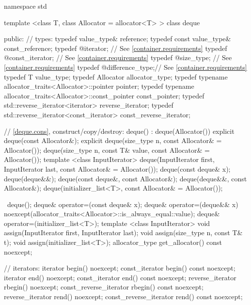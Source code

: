 \begin{codeblock}
namespace std {
  template <class T, class Allocator = allocator<T> >
  class deque {
  public:
    // types:
    typedef value_type&                           reference;
    typedef const value_type&                     const_reference;
    typedef @\impdef@                iterator;       // See \ref{container.requirements}
    typedef @\impdef@                const_iterator; // See \ref{container.requirements}
    typedef @\impdef@                size_type;      // See \ref{container.requirements}
    typedef @\impdef@                difference_type;// See \ref{container.requirements}
    typedef T                                     value_type;
    typedef Allocator                             allocator_type;
    typedef typename allocator_traits<Allocator>::pointer           pointer;
    typedef typename allocator_traits<Allocator>::const_pointer     const_pointer;
    typedef std::reverse_iterator<iterator>       reverse_iterator;
    typedef std::reverse_iterator<const_iterator> const_reverse_iterator;

    // \ref{deque.cons}, construct/copy/destroy:
    deque() : deque(Allocator()) { }
    explicit deque(const Allocator&);
    explicit deque(size_type n, const Allocator& = Allocator());
    deque(size_type n, const T& value, const Allocator& = Allocator());
    template <class InputIterator>
      deque(InputIterator first, InputIterator last, const Allocator& = Allocator());
    deque(const deque& x);
    deque(deque&&);
    deque(const deque&, const Allocator&);
    deque(deque&&, const Allocator&);
    deque(initializer_list<T>, const Allocator& = Allocator());

    ~deque();
    deque& operator=(const deque& x);
    deque& operator=(deque&& x)
      noexcept(allocator_traits<Allocator>::is_always_equal::value);
    deque& operator=(initializer_list<T>);
    template <class InputIterator>
      void assign(InputIterator first, InputIterator last);
    void assign(size_type n, const T& t);
    void assign(initializer_list<T>);
    allocator_type get_allocator() const noexcept;

    // iterators:
    iterator               begin() noexcept;
    const_iterator         begin() const noexcept;
    iterator               end() noexcept;
    const_iterator         end() const noexcept;
    reverse_iterator       rbegin() noexcept;
    const_reverse_iterator rbegin() const noexcept;
    reverse_iterator       rend() noexcept;
    const_reverse_iterator rend() const noexcept;

}}
\end{codeblock}
